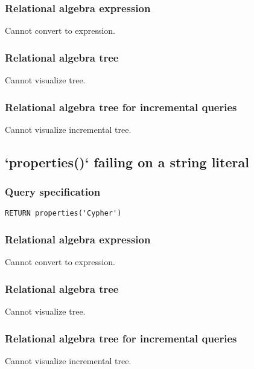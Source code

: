 \subsubsection*{Relational algebra expression}

Cannot convert to expression.

\subsubsection*{Relational algebra tree}

Cannot visualize tree.

\subsubsection*{Relational algebra tree for incremental queries}

Cannot visualize incremental tree.

\subsection{`properties()` failing on a string literal}

\subsubsection*{Query specification}

\begin{lstlisting}
RETURN properties('Cypher')
\end{lstlisting}

\subsubsection*{Relational algebra expression}

Cannot convert to expression.

\subsubsection*{Relational algebra tree}

Cannot visualize tree.

\subsubsection*{Relational algebra tree for incremental queries}

Cannot visualize incremental tree.

